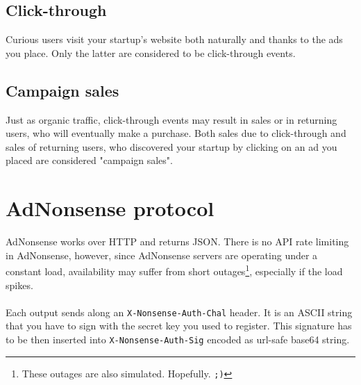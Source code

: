 \documentclass{article}
\begin{document}
\subsection{Click-through}
Curious users visit your startup's website both naturally and thanks to the ads you place. Only the latter are considered to be click-through events.

\subsection{Campaign sales}
Just as organic traffic, click-through events may result in sales or in returning users, who will eventually make a purchase.
Both sales due to click-through and sales of returning users, who discovered your startup by clicking on an ad you placed are considered "campaign sales".

\section{AdNonsense protocol}

AdNonsense works over HTTP and returns JSON. There is no API rate limiting in AdNonsense, however, since AdNonsense servers are operating under a constant load, availability may suffer from short outages\footnote{These outages are also simulated. Hopefully. \texttt{;)}}, especially if the load spikes.
\\ \\
Each output sends along an \texttt{X-Nonsense-Auth-Chal} header. It is an ASCII string that you have to sign with the secret key you used to register. This signature has to be then inserted into \texttt{X-Nonsense-Auth-Sig} encoded as url-safe base64 string.

\pagebreak
\end{document}
